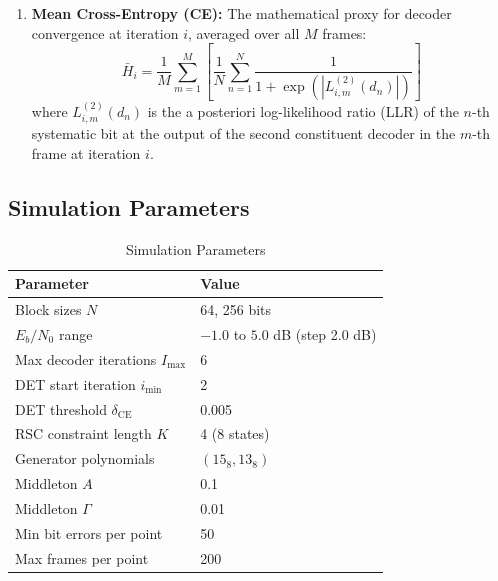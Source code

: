 \documentclass[journal,twocolumn]{IEEEtran}
\begin{document}
\begin{enumerate}
  \item \textbf{Mean Cross-Entropy (CE):} The mathematical proxy for decoder convergence at iteration $i$, averaged over all $M$ frames:
  \begin{equation}
    \bar{H}_i = \frac{1}{M} \sum_{m=1}^{M} \left[ \frac{1}{N} \sum_{n=1}^{N} \frac{1}{1 + \exp(|L^{(2)}_{i,m}(d_n)|)} \right]
  \end{equation}
  where $L^{(2)}_{i,m}(d_n)$ is the a posteriori log-likelihood ratio (LLR) of the $n$-th systematic bit at the output of the second constituent decoder in the $m$-th frame at iteration $i$.
\end{enumerate}

\subsection{Simulation Parameters}
\begin{table}[h]
\centering
\caption{Simulation Parameters}
\label{tab:params}
\begin{tabular}{ll}
\toprule
Parameter & Value \\
\midrule
Block sizes $N$           & 64, 256 bits \\
$E_b/N_0$ range           & $-1.0$ to $5.0$ dB (step 2.0 dB) \\
Max decoder iterations $I_{\max}$ & 6 \\
DET start iteration $i_{\min}$    & 2 \\
DET threshold $\delta_{\mathrm{CE}}$      & 0.005 \\
RSC constraint length $K$         & 4 (8 states) \\
Generator polynomials             & $(15_8, 13_8)$ \\
Middleton $A$             & 0.1 \\
Middleton $\Gamma$        & 0.01 \\
Min bit errors per point  & 50 \\
Max frames per point      & 200 \\
\bottomrule
\end{tabular}
\end{table}
\end{document}
